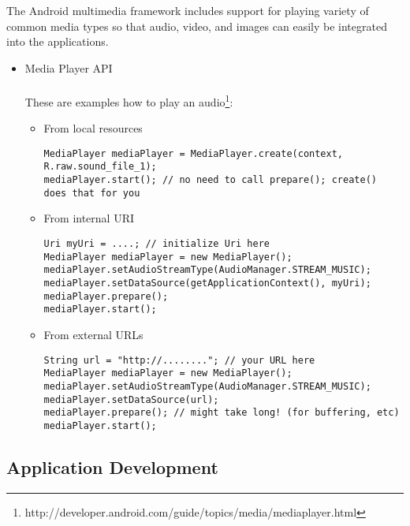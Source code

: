 \begin{flushleft}
The Android multimedia framework includes support for playing variety of common media types so that audio, video, and images can easily be integrated into the applications.
\end{flushleft}

\begin{itemize}
\item Media Player API
\\\\These are examples how to play an audio\footnote[4]{http://developer.android.com/guide/topics/media/mediaplayer.html}:
\begin{itemize}
\item From local resources
\begin{lstlisting}[frame=single, label=lst:notebookxml, caption=Example of how to play an audio from local resources]
MediaPlayer mediaPlayer = MediaPlayer.create(context, R.raw.sound_file_1);
mediaPlayer.start(); // no need to call prepare(); create() does that for you
\end{lstlisting}
\item From internal URI
\begin{lstlisting}[frame=single, label=lst:notebookxml, caption=Example of how to play an audio from internal URI]
Uri myUri = ....; // initialize Uri here
MediaPlayer mediaPlayer = new MediaPlayer();
mediaPlayer.setAudioStreamType(AudioManager.STREAM_MUSIC);
mediaPlayer.setDataSource(getApplicationContext(), myUri);
mediaPlayer.prepare();
mediaPlayer.start();
\end{lstlisting}
\item From external URLs
\begin{lstlisting}[frame=single, label=lst:notebookxml, caption=Example of how to play an audio from external URLs]
String url = "http://........"; // your URL here
MediaPlayer mediaPlayer = new MediaPlayer();
mediaPlayer.setAudioStreamType(AudioManager.STREAM_MUSIC);
mediaPlayer.setDataSource(url);
mediaPlayer.prepare(); // might take long! (for buffering, etc)
mediaPlayer.start();
\end{lstlisting}
\end{itemize}
\end{itemize}

\subsection{Application Development}
\label{sec:applicationdevelopment}

